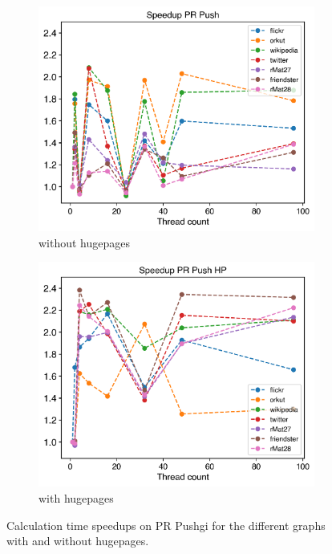 \begin{figure}
	\hfil
	\begin{subfigure}{0.4\textwidth}
		\includegraphics[width=\linewidth]{../../plots/singleNodePRPushGaloisThreads.png}
		\caption{without hugepages}
		\label{fig:galoisSpeedupPRPush_noHP}
	\end{subfigure}
	\begin{subfigure}{0.4\textwidth}
		\includegraphics[width=\linewidth]{../../plots/singleNodePRPushGaloisHPThreads.png}
		\caption{with hugepages}
		\label{fig:galoisSpeedupPRPush_HP}
	\end{subfigure}
	\hfil
	\caption{Calculation time speedups on PR Pushgi for the different graphs with and without hugepages.}
	\label{fig:galoisSpeedupPRPush}
\end{figure}
